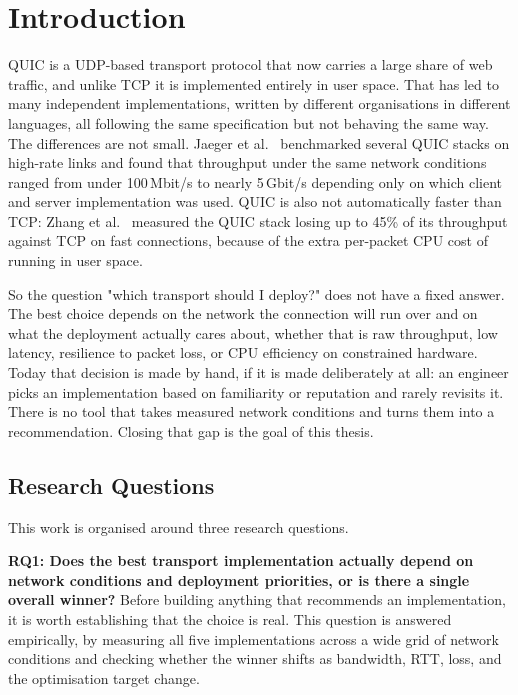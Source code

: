 \chapter{Introduction}
\label{chapter:introduction}

QUIC is a UDP-based transport protocol that now carries a large share of web
traffic, and unlike TCP it is implemented entirely in user space. That has led
to many independent implementations, written by different organisations in
different languages, all following the same specification but not behaving the
same way. The differences are not small. Jaeger et al.~\cite{jaeger2023quic}
benchmarked several QUIC stacks on high-rate links and found that throughput
under the same network conditions ranged from under 100\,Mbit/s to nearly
5\,Gbit/s depending only on which client and server implementation was used.
QUIC is also not automatically faster than TCP: Zhang et
al.~\cite{zhang2024quic} measured the QUIC stack losing up to 45\% of its
throughput against TCP on fast connections, because of the extra per-packet CPU
cost of running in user space.

So the question "which transport should I deploy?" does not have a fixed
answer. The best choice depends on the network the connection will run over and
on what the deployment actually cares about, whether that is raw throughput, low
latency, resilience to packet loss, or CPU efficiency on constrained hardware.
Today that decision is made by hand, if it is made deliberately at all: an
engineer picks an implementation based on familiarity or reputation and rarely
revisits it. There is no tool that takes measured network conditions and turns
them into a recommendation. Closing that gap is the goal of this thesis.

\section{Research Questions}
\label{sec:intro-rqs}

This work is organised around three research questions.

\textbf{RQ1: Does the best transport implementation actually depend on network
conditions and deployment priorities, or is there a single overall winner?}
Before building anything that recommends an implementation, it is worth
establishing that the choice is real. This question is answered empirically, by
measuring all five implementations across a wide grid of network conditions and
checking whether the winner shifts as bandwidth, RTT, loss, and the optimisation
target change.

